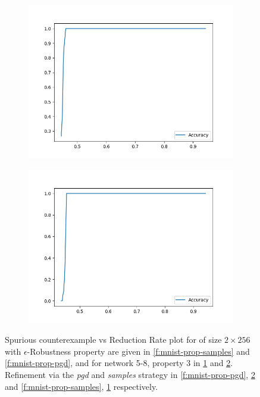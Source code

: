 \begin{figure}
    \begin{subfigure}{0.475\linewidth}
        \includegraphics[scale=0.275]{figs/acas_ncex_5_8_3_samples.png}
        \caption{}
        \label{f:acas-ncex-samples}
    \end{subfigure}
    \begin{subfigure}{0.475\linewidth}
        \includegraphics[scale=0.275]{figs/acas_ncex_5_8_3_pgd.png}
        \caption{}
        \label{f:acas-ncex-pgd}
    \end{subfigure}

    \caption{
        Spurious counterexample vs Reduction Rate plot for \mnist of size $2
        \times 256$ with $\epsilon$-Robustness property are given in 
        \ref{f:mnist-prop-samples} and \ref{f:mnist-prop-pgd}, and for \acasxu
        network 5-8, property 3 in \ref{f:acas-ncex-samples} and
        \ref{f:acas-ncex-pgd}.
        Refinement via the \textit{pgd} and \textit{samples} strategy in
        \ref{f:mnist-prop-pgd}, \ref{f:acas-ncex-pgd} and 
        \ref{f:mnist-prop-samples},
        \ref{f:acas-ncex-samples} respectively.
    }
    \label{f:ncex}
\end{figure}

